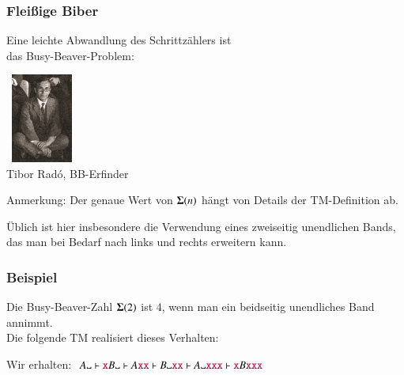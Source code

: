 \documentclass[onlymath]{beamer}
\begin{document}
\begin{frame}\frametitle{Fleißige Biber}\label{frame_rado}

\begin{minipage}[b]{7.5cm}
Eine leichte Abwandlung des Schrittzählers ist\\das Busy-Beaver-Problem:
\end{minipage}%
\begin{minipage}[t]{2.5cm}
~\hspace{2mm}\includegraphics[width=2cm]{images/Rado}\\
{\tiny \mbox{}\hspace{2mm}Tibor Rad\'{o}, BB-Erfinder}
\end{minipage}\bigskip



Anmerkung: Der genaue Wert von $\boldsymbol{\Sigma}(n)$ hängt von Details der TM-Definition ab.\\[0.5ex]
{\footnotesize Üblich ist hier insbesondere die Verwendung eines zweiseitig unendlichen Bands, das man bei Bedarf nach links und rechts erweitern kann.

}

\end{frame}

\begin{frame}\frametitle{Beispiel}

Die Busy-Beaver-Zahl $\boldsymbol{\Sigma}(2)$ ist $4$, wenn man ein beidseitig unendliches Band annimmt.\\
Die folgende TM realisiert dieses Verhalten:

\begin{center}
\end{center}

Wir erhalten: $A\blank\vdash \Sterm{x}B\blank\vdash A\Sterm{xx}\vdash B\blank\Sterm{xx}\vdash A\blank\Sterm{xxx}\vdash \Sterm{x}B\Sterm{xxx}$

\end{frame}
\end{document}
